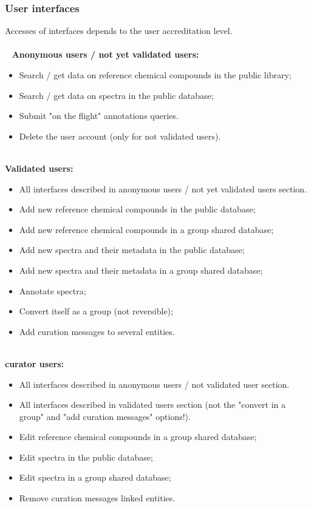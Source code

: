 \subsubsection{User interfaces} \label{userInterfaces}

Accesses of interfaces depends to the user accreditation level.\\
~\\~
\textbf{Anonymous users / not yet validated users:}
\begin{itemize}
	\item Search / get data on reference chemical compounds in the public library;
	\item Search / get data on spectra in the public database;
	\item Submit "on the flight" annotations queries.
	\item Delete the user account (only for not validated users).
\end{itemize}
~\\
\textbf{Validated users:}
\begin{itemize}
	\item All interfaces described in anonymous users / not yet validated users section.
	\item Add new reference chemical compounds in the public database;
	\item Add new reference chemical compounds in a group shared database;
	\item Add new spectra and their metadata in the public database;
	\item Add new spectra and their metadata in a group shared database;
	\item Annotate spectra;
	\item Convert itself as a group (not reversible);
	\item Add curation messages to several entities.
\end{itemize}
~\\
\textbf{curator users:}
\begin{itemize}
	\item All interfaces described in anonymous users / not validated user section.
	\item All interfaces described in validated users section (not the "convert in a group" and "add curation messages" options!).
	\item Edit reference chemical compounds in a group shared database;
	\item Edit spectra in the public database;
	\item Edit spectra in a group shared database;
	\item Remove curation messages linked entities.
\end{itemize}
